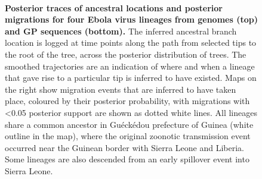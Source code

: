 \documentclass[11pt,oneside,letterpaper]{article}
\begin{document}
\begin{figure}[h]
 \centering
  \\
  \caption{\textbf{Posterior traces of ancestral locations and posterior migrations for four Ebola virus lineages from genomes (top) and GP sequences (bottom).}
  The inferred ancestral branch location is logged at time points along the path from selected tips to the root of the tree, across the posterior distribution of trees.
  The smoothed trajectories are an indication of where and when a lineage that gave rise to a particular tip is inferred to have existed.
  Maps on the right show migration events that are inferred to have taken place, coloured by their posterior probability, with migrations with <0.05 posterior support are shown as dotted white lines.
  All lineages share a common ancestor in Gu\'{e}ck\'{e}dou prefecture of Guinea (white outline in the map), where the original zoonotic transmission event occurred near the Guinean border with Sierra Leone and Liberia.
  Some lineages are also descended from an early spillover event into Sierra Leone.
  }
	\label{trace}
\end{figure}
\end{document}
